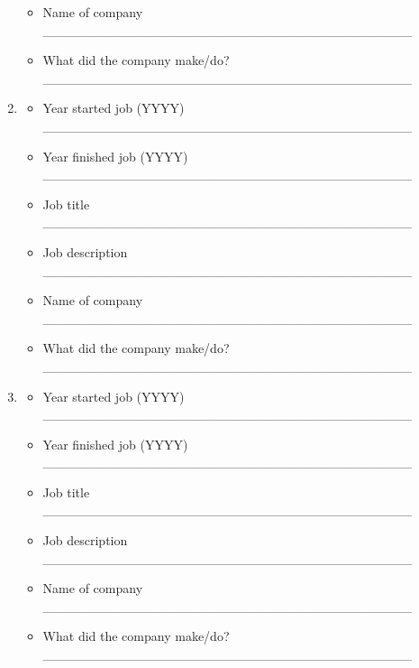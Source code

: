\documentclass[a4paper,10pt]{article}
\begin{document}
\begin{enumerate}
\begin{itemize}
         \item Name of company \_\_\_\_\_\_\_\_\_\_\_\_\_\_\_\_\_\_\_\_\_\_\_\_\_\_\_\_\_\_\_\_\_\_\_\_\_\_\_
         \item What did the company make/do? \_\_\_\_\_\_\_\_\_\_\_\_\_\_\_\_\_\_\_\_\_\_\_\_\_\_\_\_\_\_\_\_\_\_\_\_\_\_\_
      \end{itemize}
 \item
     \begin{itemize}
         \item Year started job (YYYY) \_\_\_\_\_\_\_\_\_\_\_\_\_\_\_\_\_\_\_\_\_\_\_\_\_\_\_\_\_\_\_\_\_\_\_\_\_\_\_ 
         \item Year finished job (YYYY) \_\_\_\_\_\_\_\_\_\_\_\_\_\_\_\_\_\_\_\_\_\_\_\_\_\_\_\_\_\_\_\_\_\_\_\_\_\_\_
         \item Job title \_\_\_\_\_\_\_\_\_\_\_\_\_\_\_\_\_\_\_\_\_\_\_\_\_\_\_\_\_\_\_\_\_\_\_\_\_\_\_
         \item Job description \_\_\_\_\_\_\_\_\_\_\_\_\_\_\_\_\_\_\_\_\_\_\_\_\_\_\_\_\_\_\_\_\_\_\_\_\_\_\_
         \item Name of company \_\_\_\_\_\_\_\_\_\_\_\_\_\_\_\_\_\_\_\_\_\_\_\_\_\_\_\_\_\_\_\_\_\_\_\_\_\_\_
         \item What did the company make/do? \_\_\_\_\_\_\_\_\_\_\_\_\_\_\_\_\_\_\_\_\_\_\_\_\_\_\_\_\_\_\_\_\_\_\_\_\_\_\_
      \end{itemize}
 \item
     \begin{itemize}
         \item Year started job (YYYY) \_\_\_\_\_\_\_\_\_\_\_\_\_\_\_\_\_\_\_\_\_\_\_\_\_\_\_\_\_\_\_\_\_\_\_\_\_\_\_ 
         \item Year finished job (YYYY) \_\_\_\_\_\_\_\_\_\_\_\_\_\_\_\_\_\_\_\_\_\_\_\_\_\_\_\_\_\_\_\_\_\_\_\_\_\_\_
         \item Job title \_\_\_\_\_\_\_\_\_\_\_\_\_\_\_\_\_\_\_\_\_\_\_\_\_\_\_\_\_\_\_\_\_\_\_\_\_\_\_
         \item Job description \_\_\_\_\_\_\_\_\_\_\_\_\_\_\_\_\_\_\_\_\_\_\_\_\_\_\_\_\_\_\_\_\_\_\_\_\_\_\_
         \item Name of company \_\_\_\_\_\_\_\_\_\_\_\_\_\_\_\_\_\_\_\_\_\_\_\_\_\_\_\_\_\_\_\_\_\_\_\_\_\_\_
         \item What did the company make/do? \_\_\_\_\_\_\_\_\_\_\_\_\_\_\_\_\_\_\_\_\_\_\_\_\_\_\_\_\_\_\_\_\_\_\_\_\_\_\_
      \end{itemize}
       

\end{enumerate}
\end{document}
